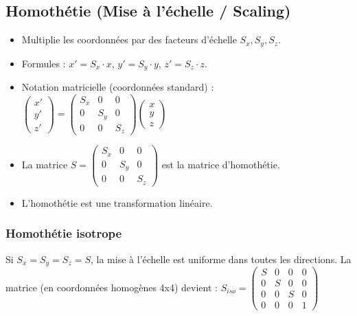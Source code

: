 \documentclass{article}
\begin{document}
\subsection{Homothétie (Mise à l'échelle / Scaling)}

\begin{itemize}
    \item Multiplie les coordonnées par des facteurs d'échelle $S_x, S_y, S_z$.
    \item Formules : $x' = S_x \cdot x$, $y' = S_y \cdot y$, $z' = S_z \cdot z$.
    \item Notation matricielle (coordonnées standard) :
    $\begin{pmatrix} x' \\ y' \\ z' \end{pmatrix} = \begin{pmatrix} S_x & 0 & 0 \\ 0 & S_y & 0 \\ 0 & 0 & S_z \end{pmatrix} \begin{pmatrix} x \\ y \\ z \end{pmatrix}$
    \item La matrice $S = \begin{pmatrix} S_x & 0 & 0 \\ 0 & S_y & 0 \\ 0 & 0 & S_z \end{pmatrix}$ est la matrice d'homothétie.
    \item L'homothétie est une transformation linéaire.
\end{itemize}

\subsubsection{Homothétie isotrope}
Si $S_x = S_y = S_z = S$, la mise à l'échelle est uniforme dans toutes les directions. La matrice (en coordonnées homogènes 4x4) devient :
$S_{iso} = \begin{pmatrix} S & 0 & 0 & 0 \\ 0 & S & 0 & 0 \\ 0 & 0 & S & 0 \\ 0 & 0 & 0 & 1 \end{pmatrix}$
\end{document}
